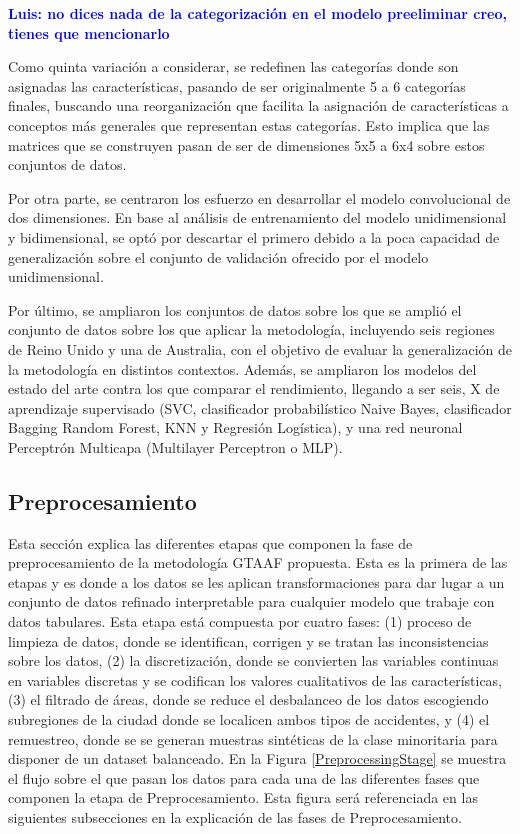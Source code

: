 \documentclass{uathesis-es}
\begin{document}
{	\textcolor{blue}{\textbf{Luis: no dices nada de la categorización en el modelo preeliminar creo, tienes que mencionarlo}}
	
	Como quinta variación a considerar, se redefinen las categorías donde son asignadas las características, pasando de ser originalmente 5 a 6 categorías finales, buscando una reorganización que facilita la asignación de características a conceptos más generales que representan estas categorías. Esto implica que las matrices que se construyen pasan de ser de dimensiones 5x5 a 6x4 sobre estos conjuntos de datos.
	
	Por otra parte, se centraron los esfuerzo en desarrollar el modelo convolucional de dos dimensiones. En base al análisis de entrenamiento del modelo unidimensional y bidimensional, se optó por descartar el primero debido a la poca capacidad de generalización sobre el conjunto de validación ofrecido por el modelo unidimensional.
	
	Por último, se ampliaron los conjuntos de datos sobre los que se amplió el conjunto de datos sobre los que aplicar la metodología, incluyendo seis regiones de Reino Unido y una de Australia, con el objetivo de evaluar la generalización de la metodología en distintos contextos. Además, se ampliaron los modelos del estado del arte contra los que comparar el rendimiento, llegando a ser seis, X de aprendizaje supervisado (SVC, clasificador probabilístico Naive Bayes, clasificador Bagging Random Forest, KNN y Regresión Logística), y una red neuronal Perceptrón Multicapa (Multilayer Perceptron o MLP).
	
	\subsection{Preprocesamiento}
	
	Esta sección explica las diferentes etapas que componen la fase de preprocesamiento de la metodología GTAAF propuesta. Esta es la primera de las etapas y es donde a los datos se les aplican transformaciones para dar lugar a un conjunto de datos refinado interpretable para cualquier modelo que trabaje con datos tabulares. Esta etapa está compuesta por cuatro fases: (1) proceso de limpieza de datos, donde se identifican, corrigen y se tratan las inconsistencias sobre los datos, (2) la discretización, donde se convierten las variables continuas en variables discretas y se codifican los valores cualitativos de las características, (3) el filtrado de áreas, donde se reduce el desbalanceo de los datos escogiendo subregiones de la ciudad donde se localicen ambos tipos de accidentes, y (4) el remuestreo, donde se se generan muestras sintéticas de la clase minoritaria para disponer de un dataset balanceado. En la Figura \ref{PreprocessingStage} se muestra el flujo sobre el que pasan los datos para cada una de las diferentes fases que componen la etapa de Preprocesamiento. Esta figura será referenciada en las siguientes subsecciones en la explicación de las fases de Preprocesamiento.
	
}
\end{document}

